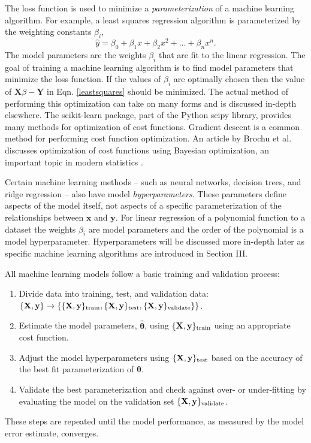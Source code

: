 The loss function is used to minimize a \textit{parameterization} of a machine learning algorithm. For example, a least squares regression algorithm is parameterized by the weighting constants $\beta_i$,
\begin{equation}
	\hat y = \beta_0 + \beta_1 x + \beta_2 x^2 + \ldots + \beta_n x^n.
	\label{beta}
\end{equation}
The model parameters are the weights $\beta_i$ that are fit to the linear regression. The goal of training a machine learning algorithm is to find model parameters that minimize the loss function. If the values of $\beta_i$ are optimally chosen then the value of $\mathbf{X}\beta-\mathbf{Y}$ in Eqn. \ref{leastsquares} should be minimized. The actual method of performing this optimization can take on many forms and is discussed in-depth elsewhere. The scikit-learn package, part of the Python scipy library, provides many methods for optimization of cost functions\cite{ScipyOptimization}. Gradient descent is a common method for performing cost function optimization\cite{GradientDescent2017}. An article by Brochu et al. discusses optimization of cost functions using Bayesian optimization, an important topic in modern statistics \cite{Brochu2010}.

Certain machine learning methods -- such as neural networks, decision trees, and ridge regression -- also have model \textit{hyperparameters}. These parameters define aspects of the model itself, not aspects of a specific parameterization of the relationships between $\mathbf{x}$ and $\mathbf{y}$. For linear regression of a polynomial function to a dataset the weights $\beta_i$ are model parameters and the order of the polynomial is a model hyperparameter. Hyperparameters will be discussed more in-depth later as specific machine learning algorithms are introduced in Section III.

All machine learning models follow a basic training and validation process:
\begin{enumerate}
    \item Divide data into training, test, and validation data: $\{{\bf X}, {\bf y}\} \to \left\{ \{{\bf X}, {\bf y}\}_{\rm train}, \{{\bf X}, {\bf y}\}_{\rm test}, \{{\bf X}, {\bf y}\}_{\rm validate}\}  \right\}$.
    \item Estimate the model parameters, $\hat{\boldsymbol{\theta}}$, using $\{{\bf X}, {\bf y}\}_{\rm train}$ using an appropriate cost function. 
        \item Adjust the model hyperparameters using $\{{\bf X}, {\bf y}\}_{\rm test}$ based on the accuracy of the best fit parameterization of $\boldsymbol{\theta}$.
    \item Validate the best parameterization and check against over- or under-fitting by evaluating the model on the validation set $\{ {\bf X}, {\bf y}\}_{\rm validate}$.
\end{enumerate}
These steps are repeated until the model performance, as measured by the model error estimate, converges.

